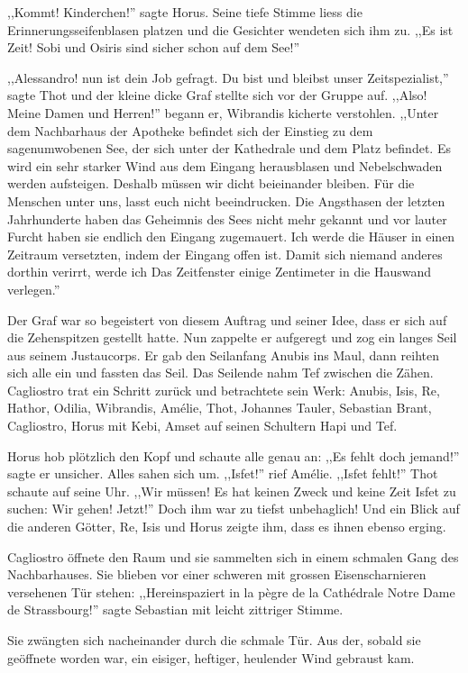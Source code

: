 ,,Kommt! Kinderchen!'' sagte Horus. Seine tiefe Stimme liess die Erinnerungsseifenblasen platzen und die Gesichter wendeten sich ihm zu. ,,Es ist Zeit! Sobi und Osiris sind sicher schon auf dem See!'' 

,,Alessandro! nun ist dein Job gefragt. Du bist und bleibst unser Zeitspezialist,'' sagte Thot und der kleine dicke Graf stellte sich vor der Gruppe auf. ,,Also! Meine Damen und Herren!'' begann er, Wibrandis kicherte verstohlen. ,,Unter dem Nachbarhaus der Apotheke befindet sich der Einstieg zu dem sagenumwobenen See, der sich unter der Kathedrale und dem Platz befindet. Es wird ein sehr starker Wind aus dem Eingang herausblasen und Nebelschwaden werden aufsteigen. Deshalb müssen wir dicht beieinander bleiben. Für die Menschen unter uns, lasst euch nicht beeindrucken. Die Angsthasen der letzten Jahrhunderte haben das Geheimnis des Sees nicht mehr gekannt und vor lauter Furcht haben sie endlich den Eingang zugemauert. Ich werde die Häuser in einen Zeitraum versetzten, indem der Eingang offen ist. Damit sich niemand anderes dorthin verirrt, werde ich Das Zeitfenster einige Zentimeter in die Hauswand verlegen.''

Der Graf war so begeistert von diesem Auftrag und seiner Idee, dass er sich auf die Zehenspitzen gestellt hatte. Nun zappelte er aufgeregt und zog ein langes Seil aus seinem Justaucorps. Er gab den Seilanfang Anubis ins Maul, dann reihten sich alle ein und fassten das Seil. Das Seilende nahm Tef zwischen die Zähen. Cagliostro trat ein Schritt zurück und betrachtete sein Werk: Anubis, Isis, Re, Hathor, Odilia, Wibrandis, Amélie, Thot, Johannes Tauler, Sebastian Brant, Cagliostro, Horus mit Kebi, Amset auf seinen Schultern Hapi und Tef. 

Horus hob plötzlich den Kopf und schaute alle genau an: ,,Es fehlt doch jemand!'' sagte er unsicher. Alles sahen sich um. ,,Isfet!'' rief Amélie. ,,Isfet fehlt!'' Thot schaute auf seine Uhr. ,,Wir müssen! Es hat keinen Zweck und keine Zeit Isfet zu suchen: Wir gehen! Jetzt!'' Doch ihm war zu tiefst unbehaglich! Und ein Blick auf die anderen Götter, Re, Isis und Horus zeigte ihm, dass es ihnen ebenso erging.

Cagliostro öffnete den Raum und sie sammelten sich in einem schmalen Gang des Nachbarhauses. Sie blieben vor einer schweren mit grossen Eisenscharnieren versehenen Tür stehen: ,,Hereinspaziert in la pègre de la Cathédrale Notre Dame de Strassbourg!'' sagte Sebastian mit leicht zittriger Stimme.

Sie zwängten sich nacheinander durch die schmale Tür. Aus der, sobald sie geöffnete worden war, ein eisiger, heftiger, heulender Wind gebraust kam.

